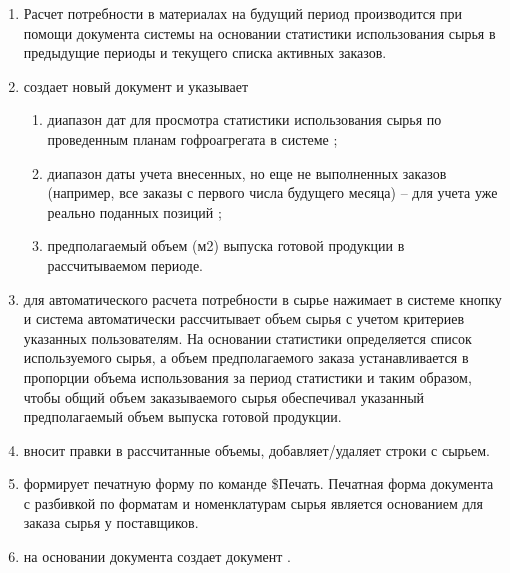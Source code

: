 \begin{enumerate}

\item	Расчет потребности в материалах на будущий период производится \purchase при помощи документа системы \gofro {} на основании статистики использования сырья в предыдущие периоды и текущего списка активных заказов.
\item	\purchase создает новый документ  и указывает
\begin{enumerate}
    \item диапазон дат для просмотра статистики использования сырья по проведенным планам гофроагрегата в системе \gofro;
\item 	диапазон даты учета внесенных, но еще не выполненных заказов (например, все заказы с первого числа будущего месяца) – для учета уже реально поданных позиций ;
\item 	предполагаемый объем (м2) выпуска готовой продукции в рассчитываемом периоде.
\end{enumerate}
\item	\purchase для автоматического расчета потребности в сырье нажимает в системе \gofro кнопку  и система \gofro автоматически рассчитывает объем сырья с учетом критериев указанных пользователям. На основании статистики определяется список используемого сырья, а объем предполагаемого заказа устанавливается в пропорции объема использования за период статистики и таким образом, чтобы общий объем заказываемого сырья обеспечивал указанный предполагаемый объем выпуска готовой продукции.
\item	\purchase вносит правки в рассчитанные объемы, добавляет/удаляет строки с сырьем.
\item	\purchase формирует печатную форму по команде \$Печать. Печатная форма документа с разбивкой по форматам и номенклатурам сырья является основанием для заказа сырья у поставщиков.
\item	\purchase на основании документа  создает документ .

\end{enumerate}
